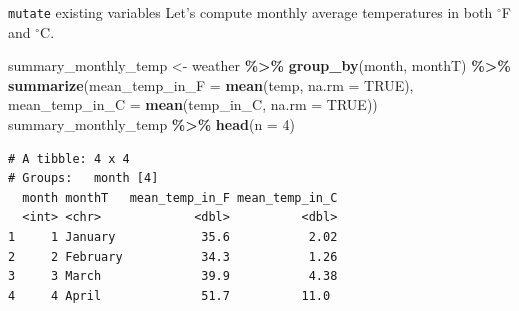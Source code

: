 \documentclass[
  ignorenonframetext,
]{beamer}
\newenvironment{Shaded}{\begin{snugshade}}{\end{snugshade}}
\newcommand{\AttributeTok}[1]{\textcolor[rgb]{0.13,0.29,0.53}{#1}}
\newcommand{\ConstantTok}[1]{\textcolor[rgb]{0.56,0.35,0.01}{#1}}
\newcommand{\DecValTok}[1]{\textcolor[rgb]{0.00,0.00,0.81}{#1}}
\newcommand{\FunctionTok}[1]{\textcolor[rgb]{0.13,0.29,0.53}{\textbf{#1}}}
\newcommand{\NormalTok}[1]{#1}
\newcommand{\OtherTok}[1]{\textcolor[rgb]{0.56,0.35,0.01}{#1}}
\newcommand{\SpecialCharTok}[1]{\textcolor[rgb]{0.81,0.36,0.00}{\textbf{#1}}}
\begin{document}
\begin{frame}[fragile]{\texttt{mutate} existing variables}
\protect\hypertarget{mutate-existing-variables-3}{}
Let's compute monthly average temperatures in both \(^\circ\)F and
\(^\circ\)C.

\normalsize

\begin{Shaded}
\begin{Highlighting}[]
\NormalTok{summary\_monthly\_temp }\OtherTok{\textless{}{-}}\NormalTok{ weather }\SpecialCharTok{\%\textgreater{}\%} 
  \FunctionTok{group\_by}\NormalTok{(month, monthT) }\SpecialCharTok{\%\textgreater{}\%} 
  \FunctionTok{summarize}\NormalTok{(}\AttributeTok{mean\_temp\_in\_F =} \FunctionTok{mean}\NormalTok{(temp, }\AttributeTok{na.rm =} \ConstantTok{TRUE}\NormalTok{), }
            \AttributeTok{mean\_temp\_in\_C =} \FunctionTok{mean}\NormalTok{(temp\_in\_C, }\AttributeTok{na.rm =} \ConstantTok{TRUE}\NormalTok{)) }
\NormalTok{summary\_monthly\_temp }\SpecialCharTok{\%\textgreater{}\%}
  \FunctionTok{head}\NormalTok{(}\AttributeTok{n =} \DecValTok{4}\NormalTok{)}
\end{Highlighting}
\end{Shaded}

\begin{verbatim}
# A tibble: 4 x 4
# Groups:   month [4]
  month monthT   mean_temp_in_F mean_temp_in_C
  <int> <chr>             <dbl>          <dbl>
1     1 January            35.6           2.02
2     2 February           34.3           1.26
3     3 March              39.9           4.38
4     4 April              51.7          11.0 
\end{verbatim}

\normalsize
\end{frame}
\end{document}
